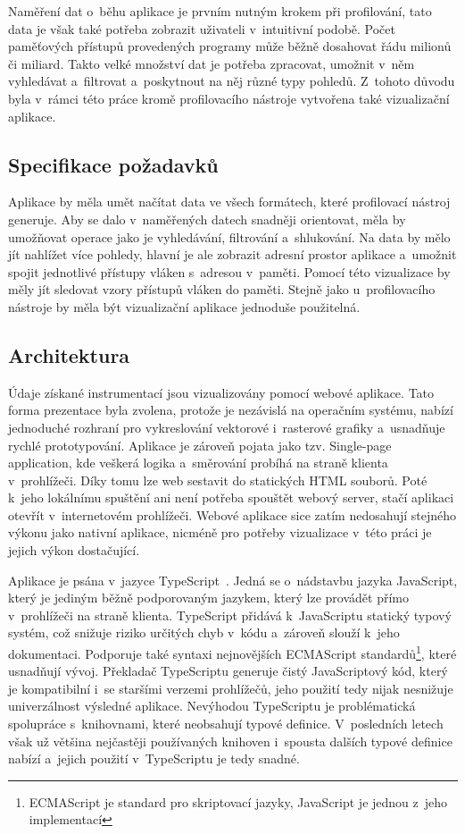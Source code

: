Naměření dat o~běhu aplikace je prvním nutným krokem při profilování, tato data je však také potřeba zobrazit uživateli v~intuitivní podobě. Počet paměťových přístupů provedených programy může běžně dosahovat řádu milionů či miliard. Takto velké množství dat je potřeba zpracovat, umožnit v~něm vyhledávat a~filtrovat a~poskytnout na něj různé typy pohledů. Z~tohoto důvodu byla v~rámci této práce kromě profilovacího nástroje vytvořena také vizualizační aplikace.

\subsection{Specifikace požadavků}
Aplikace by měla umět načítat data ve všech formátech, které profilovací nástroj generuje. Aby se dalo v~naměřených datech snadněji orientovat, měla by umožňovat operace jako je vyhledávání, filtrování a~shlukování. Na data by mělo jít nahlížet více pohledy, hlavní je ale zobrazit adresní prostor aplikace a~umožnit spojit jednotlivé přístupy vláken s~adresou v~paměti. Pomocí této vizualizace by měly jít sledovat vzory přístupů vláken do paměti. Stejně jako u~profilovacího nástroje by měla být vizualizační aplikace jednoduše použitelná.

\subsection{Architektura}
Údaje získané instrumentací jsou vizualizovány pomocí webové aplikace. Tato forma prezentace byla zvolena, protože je nezávislá na operačním systému, nabízí jednoduché rozhraní pro vykreslování vektorové i~rasterové grafiky a~usnadňuje rychlé prototypování. Aplikace je zároveň pojata jako tzv. Single-page application, kde veškerá logika a~směrování probíhá na straně klienta v~prohlížeči. Díky tomu lze web sestavit do statických HTML souborů. Poté k~jeho lokálnímu spuštění ani není potřeba spouštět webový server, stačí aplikaci otevřít v~internetovém prohlížeči. Webové aplikace sice zatím nedosahují stejného výkonu jako nativní aplikace, nicméně pro potřeby vizualizace v~této práci je jejich výkon dostačující.

Aplikace je psána v~jazyce TypeScript~\cite{typescript}. Jedná se o~nádstavbu jazyka JavaScript, který je jediným běžně podporovaným jazykem, který lze provádět přímo v~prohlížeči na straně klienta. TypeScript přidává k~JavaScriptu statický typový systém, což snižuje riziko určitých chyb v~kódu a~zároveň slouží k~jeho dokumentaci. Podporuje také syntaxi nejnovějších ECMAScript standardů\footnote{ECMAScript je standard pro skriptovací jazyky, JavaScript je jednou z~jeho implementací}, které usnadňují vývoj. Překladač TypeScriptu generuje čistý JavaScriptový kód, který je kompatibilní i~se staršími verzemi prohlížečů, jeho použití tedy nijak nesnižuje univerzálnost výsledné aplikace. Nevýhodou TypeScriptu je problématická spolupráce s~knihovnami, které neobsahují typové definice. V~posledních letech však už většina nejčastěji používaných knihoven i~spousta dalších typové definice nabízí a~jejich použití v~TypeScriptu je tedy snadné.

